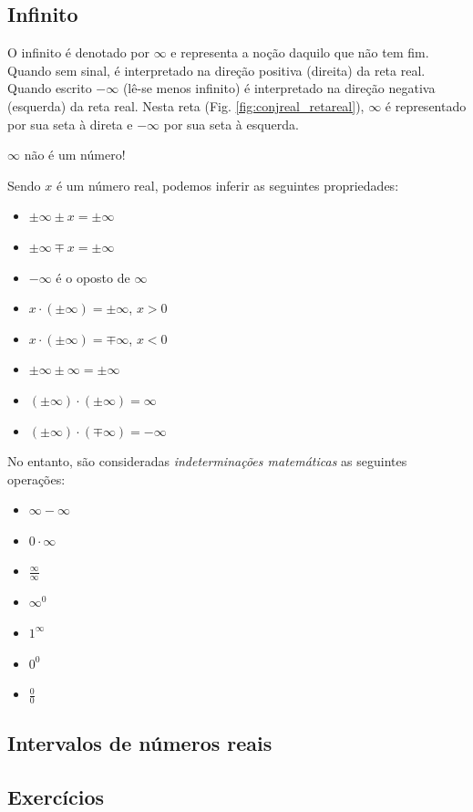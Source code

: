 \subsection{Infinito}

O infinito é denotado por $\infty$ e representa a noção daquilo que não tem fim. Quando sem sinal, é interpretado na direção positiva (direita) da reta real. Quando escrito $-\infty$ (lê-se menos infinito) é interpretado na direção negativa (esquerda) da reta real. Nesta reta (Fig. \ref{fig:conjreal_retareal}), $\infty$ é representado por sua seta à direta e $-\infty$ por sua seta à esquerda.

\begin{obs}
  $\infty$ não é um número!
\end{obs}

Sendo $x$ é um número real, podemos inferir as seguintes propriedades:
\begin{itemize}
\item $\pm\infty \pm x = \pm\infty$ \\
\item $\pm\infty \mp x = \pm\infty$ \\
\item $-\infty$ é o oposto de $\infty$ \\
\item $x\cdot(\pm\infty) = \pm\infty$, $x>0$
\item $x\cdot(\pm\infty) = \mp\infty$, $x<0$
\item $\pm\infty \pm \infty = \pm\infty$ \\
\item $(\pm\infty)\cdot(\pm\infty) = \infty$ \\
\item $(\pm\infty)\cdot(\mp\infty) = -\infty$
\end{itemize}

No entanto, são consideradas \emph{indeterminações matemáticas} as seguintes operações:
\begin{itemize}
\item $\infty - \infty$
\item $0\cdot\infty$
\item $\displaystyle\frac{\infty}{\infty}$
\item $\infty^0$
\item $1^\infty$
\item $0^0$
\item $\displaystyle\frac{0}{0}$
\end{itemize}

\subsection{Intervalos de números reais}

\emconstrucao

\subsection*{Exercícios}

\emconstrucao

